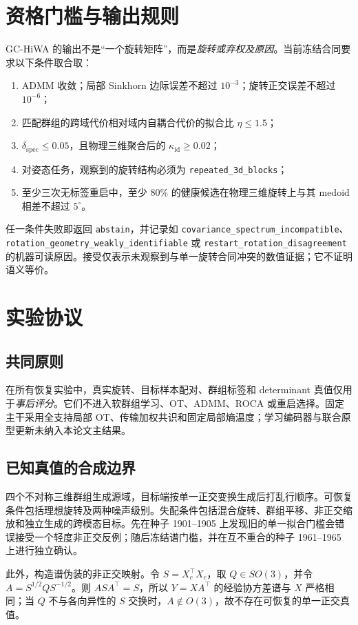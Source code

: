 \documentclass[UTF8,a4paper,11pt]{ctexart}
\theoremstyle{definition}
\theoremstyle{remark}
\begin{document}
\section{资格门槛与输出规则}\label{sec:qualification}
GC-HiWA 的输出不是“一个旋转矩阵”，而是\emph{旋转或弃权及原因}。当前冻结合同要求以下条件取合取：
\begin{enumerate}
 \item ADMM 收敛；局部 Sinkhorn 边际误差不超过 $10^{-3}$；旋转正交误差不超过 $10^{-6}$；
 \item 匹配群组的跨域代价相对域内自耦合代价的拟合比 $\eta\le1.5$；
 \item $\delta_{\mathrm{spec}}\le0.05$，且物理三维聚合后的 $\kappa_{\mathrm{id}}\ge0.02$；
 \item 对姿态任务，观察到的旋转结构必须为 \texttt{repeated\_3d\_blocks}；
 \item 至少三次无标签重启中，至少 $80\%$ 的健康候选在物理三维旋转上与其 medoid 相差不超过 $5^\circ$。
\end{enumerate}
任一条件失败即返回 \texttt{abstain}，并记录如 \texttt{covariance\_spectrum\_incompatible}、\texttt{rotation\_geometry\_weakly\_identifiable} 或 \texttt{restart\_rotation\_disagreement} 的机器可读原因。接受仅表示未观察到与单一旋转合同冲突的数值证据；它不证明语义等价。

\section{实验协议}\label{sec:experiments}
\subsection{共同原则}
在所有恢复实验中，真实旋转、目标样本配对、群组标签和 determinant 真值仅用于\emph{事后评分}。它们不进入软群组学习、OT、ADMM、ROCA 或重启选择。固定主干采用全支持局部 OT、传输加权共识和固定局部熵温度；学习编码器与联合原型更新未纳入本论文主结果。

\subsection{已知真值的合成边界}
四个不对称三维群组生成源域，目标端按单一正交变换生成后打乱行顺序。可恢复条件包括理想旋转及两种噪声级别。失配条件包括混合旋转、群组平移、非正交缩放和独立生成的跨模态目标。先在种子 1901--1905 上发现旧的单一拟合门槛会错误接受一个轻度非正交反例；随后冻结谱门槛，并在互不重合的种子 1961--1965 上进行独立确认。

此外，构造谱伪装的非正交映射。令 $S=X_c^\top X_c$，取 $Q\in SO(3)$，并令 $A=S^{1/2}QS^{-1/2}$。则 $ASA^\top=S$，所以 $Y=XA^\top$ 的经验协方差谱与 $X$ 严格相同；当 $Q$ 不与各向异性的 $S$ 交换时，$A\notin O(3)$，故不存在可恢复的单一正交真值。
\end{document}
